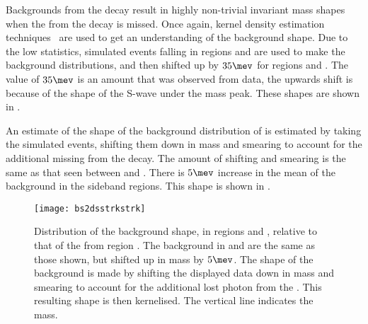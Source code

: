Backgrounds from the decay \bstodskstrk result in highly non-trivial invariant mass shapes when the
\pip from the \Kstarz decay is missed.
Once again, kernel density estimation techniques~\cite{Cranmer:2000du} are used to get an
understanding of the background shape.
Due to the low statistics, simulated \bstodskstrk events falling in regions \rA and \rB are used to
make the background distributions, and then shifted up by $35\mev$ for regions \rC and \rD.
The value of $35\mev$ is an amount that was observed from data, the upwards shift is because of the
shape of the S-wave under the \phii mass peak.
These shapes are shown in .

An estimate of the shape of the background distribution of \bstodsstrkstrk is estimated by taking
the simulated \bstodskstrk events, shifting them down in mass and smearing to account for the
additional missing \photon from the \Dss decay.
The amount of shifting and smearing is the same as that seen between \btodsphi and \btodsstrphi.
There is $5\mev$ increase in the mean of the background in the \phii sideband regions.
This shape is shown in .


\begin{figure}
  \begin{center}
    \texttt{[image: bs2dsstrkstrk]}
    \caption[Shapes of the \bstodsstrkstrk background]
    {
      Distribution of the \bstodsstrkstrk background shape, in regions \rA and \rB, relative to
      that of the \bstodskstrk from region \rA.
      The \bstodsstrkstrk background in \rC and \rD are the same as those shown, but shifted up in
      mass by $5\mev$.
      The shape of the \bstodsstrkstrk background is made by shifting the displayed data down in
      mass and smearing to account for the additional lost photon from the \Dss.
      This resulting shape is then kernelised.
      The vertical line indicates the \Bp mass.
    }
    \label{fig:dsphi:bstodsstrkstrk}
  \end{center}
\end{figure}



